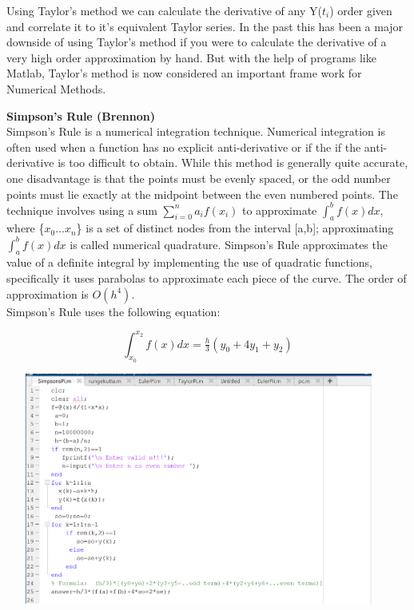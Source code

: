 \documentclass[letterpaper,12pt]{article}
\begin{document}
 \indent Using Taylor's method we can calculate the derivative of any Y($t_{i}$) order given and correlate it to it's equivalent Taylor series. \cite{Kiltu17} In the past this has been a major downside of using Taylor's method if you were to calculate the derivative of a very high order approximation by hand. But with the help of programs like Matlab, Taylor's method is now considered an important frame work for Numerical Methods. 
    \item \textbf{Simpson's Rule (Brennon)}
    \\\indent Simpson's Rule is a  numerical integration technique.\cite{Matthews03} Numerical integration is often used when a function has no explicit anti-derivative or if the if the anti-derivative is too difficult to obtain. While this method is generally quite accurate, one disadvantage is that the points must be evenly spaced, or the odd number points must
lie exactly at the midpoint between the even numbered points.\cite{Young18} The technique involves using a sum $ \sum_{i=0}^{n} a_{i}f(x_{i})$ to approximate $\int_{a}^{b} f(x) dx$, where \{$x_{0}...x_{n}$\} is a set of distinct nodes from the interval [a,b]; approximating $\int_{a}^{b} f(x) dx$ is called numerical quadrature.   \cite{Bourne18} Simpson's Rule approximates the value of a definite integral by implementing the use of quadratic functions, specifically it uses parabolas to approximate each piece of the curve. The order of approximation is $O(h^4)$.
    \\\indent Simpson's Rule uses the following equation:
    \begin{center}
    $$ \int_{x_{0}}^{x_{2}} f(x) dx=\tfrac{h}{3}(y_{0}+4y_{1}+y_{2})$$
    \end{center}
\begin{center}
    \includegraphics[width=5in, height=3in]{SimpsonsCode.png}
\end{center}
\end{document}
